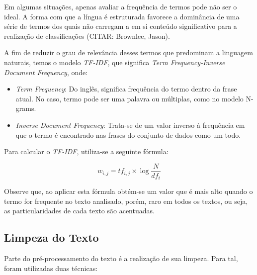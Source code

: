 Em algumas situações, apenas avaliar a frequência de termos pode não ser o ideal. A forma com que a língua é estruturada favorece a dominância de uma série de termos dos quais não carregam a em si conteúdo significativo para a realização de classificações (CITAR: Brownlee, Jason).

A fim de reduzir o grau de relevância desses termos que predominam a linguagem naturais, temos o modelo \textit{TF-IDF}, que significa \textit{Term Frequency-Inverse Document Frequency}, onde:

\begin{itemize}
\item \textit{Term Frequency}: Do inglês, significa frequência do termo dentro da frase atual. No caso, termo pode ser uma palavra ou múltiplas, como no modelo N-grams.
\item \textit{Inverse Document Frequency}: Trata-se de um valor inverso à frequência em que o termo é encontrado nas frases do conjunto de dados como um todo.
\end{itemize}

Para calcular o \textit{TF-IDF}, utiliza-se a seguinte fórmula:

\begin{equation}
w_{i,j} = tf_{i,j}\times\log \frac{N}{df_i}
\end{equation}

Observe que, ao aplicar esta fórmula obtém-se um valor que é mais alto quando o termo for frequente no texto analisado, porém, raro em todos os textos, ou seja, as particularidades de cada texto são acentuadas.

\subsection{Limpeza do Texto}

Parte do pré-processamento do texto é a realização de sua limpeza. Para tal, foram utilizadas duas técnicas:

